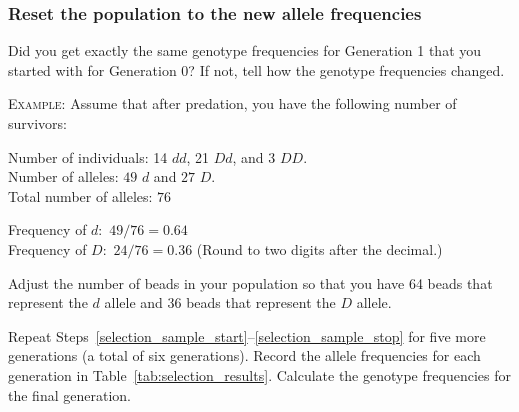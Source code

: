 \documentclass[12pt]{exam}
\newcommand{\allele}[1]{$#1$}
\begin{document}
\subsubsection*{Reset the population to the new allele frequencies}





\begin{questions}
	
	\question
	Did you get exactly the same genotype frequencies for Generation 1 
	that you started with for Generation 0? If not, tell how the genotype
	frequencies changed. 
	
	\vspace*{5\baselineskip}
	


	\textsc{Example:} Assume that after predation, you have the following number of survivors:
	
	Number of individuals: 14 \allele{dd}, 21 \allele{Dd}, and 3 \allele{DD}.\\
	Number of alleles: $49$ \allele{d} and $27$ \allele{D}.\\
	Total number of alleles: $76$

	Frequency of \allele{d:} $49/76 = 0.64$\\
	Frequency of \allele{D:} $24/76 = 0.36$ (Round to two digits after the decimal.)

	Adjust the number of beads in your population so that you have 64 beads that represent the \allele{d} allele and 36 beads that represent the \allele{D} allele.  
	
	\item Repeat Steps~\ref{selection_sample_start}–\ref{selection_sample_stop} for five more generations (a total of six generations). Record the allele frequencies for each generation in Table~\ref{tab:selection_results}. Calculate the genotype frequencies for the final generation. 
	


\newpage



\end{questions}
\end{document}
